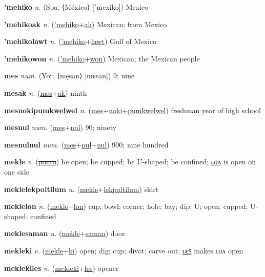 \textbf{\hypertarget{'mehiko}{'mehiko}} \textit{n.} (Spa. ⟨México⟩ [ˈmexiko])
Mexico

\textbf{\hypertarget{'mehikoak}{'mehikoak}} \textit{n.} (\hyperlink{'mehiko}{'mehiko}+\allowbreak \hyperlink{ak}{ak})
Mexican; from Mexico

\textbf{\hypertarget{'mehikolawt}{'mehikolawt}} \textit{n.} (\hyperlink{'mehiko}{'mehiko}+\allowbreak \hyperlink{lawt}{lawt})
Gulf of Mexico

\textbf{\hypertarget{'mehikowon}{'mehikowon}} \textit{n.} (\hyperlink{'mehiko}{'mehiko}+\allowbreak \hyperlink{won}{won})
Mexican; the Mexican people

\textbf{\hypertarget{mes}{mes}} \textit{num.} (Yor. ⟨mẹsan⟩ [mɛsan])
9; nine

\textbf{\hypertarget{mesak}{mesak}} \textit{n.} (\hyperlink{mes}{mes}+\allowbreak \hyperlink{ak}{ak})
ninth

\textbf{\hypertarget{mesnokipumkwelwel}{mesnokipumkwelwel}} \textit{n.} (\hyperlink{mes}{mes}+\allowbreak \hyperlink{noki}{noki}+\allowbreak \hyperlink{pumkwelwel}{pumkwelwel})
freshman year of high school

\textbf{\hypertarget{mesnul}{mesnul}} \textit{num.} (\hyperlink{mes}{mes}+\allowbreak \hyperlink{nul}{nul})
90; ninety

\textbf{\hypertarget{mesnulnul}{mesnulnul}} \textit{num.} (\hyperlink{mes}{mes}+\allowbreak \hyperlink{nul}{nul}+\allowbreak \hyperlink{nul}{nul})
900; nine hundred

\textbf{\hypertarget{mekle}{mekle}} \textit{v.} (\hyperlink{ponto}{\sout{ponto}})
be open; be cupped; be U-shaped; be confined; \hyperlink{meklelon}{ʟᴏᴧ} is open on one side

\textbf{\hypertarget{meklelekpoltilum}{meklelekpoltilum}} \textit{n.} (\hyperlink{mekle}{mekle}+\allowbreak \hyperlink{lekpoltilum}{lekpoltilum})
skirt

\textbf{\hypertarget{meklelon}{meklelon}} \textit{n.} (\hyperlink{mekle}{mekle}+\allowbreak \hyperlink{lon}{lon})
cup; bowl; corner; hole; bay; dip; U; open; cupped; U-shaped; confined

\textbf{\hypertarget{meklesaman}{meklesaman}} \textit{n.} (\hyperlink{mekle}{mekle}+\allowbreak \hyperlink{saman}{saman})
door

\textbf{\hypertarget{mekleki}{mekleki}} \textit{v.} (\hyperlink{mekle}{mekle}+\allowbreak \hyperlink{ki}{ki})
open; dig; cup; divot; carve out; \hyperlink{meklekiles}{ʟєꜱ} makes ʟᴏᴧ open

\textbf{\hypertarget{meklekiles}{meklekiles}} \textit{n.} (\hyperlink{mekleki}{mekleki}+\allowbreak \hyperlink{les}{les})
opener

